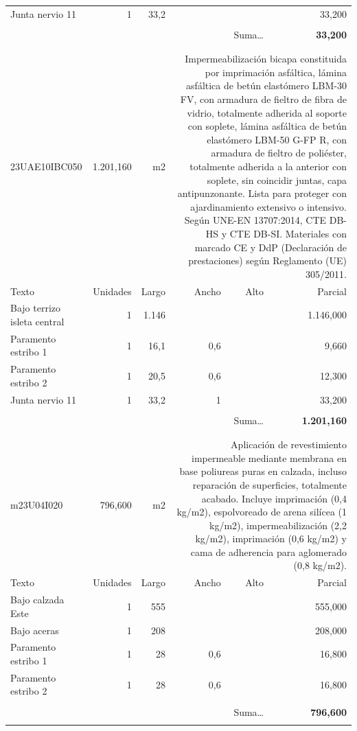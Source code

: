 \documentclass{book}%
\begin{document}
\begin{longtable}{lrrrrr}
\hline%
\multicolumn{1}{p{3.5cm}}{Junta nervio 11}&1&33,2&&&    33,200\\%
&&&&&\\%
\multicolumn{5}{r}{Suma\ldots}&\textbf{    33,200}\\%
\hline%
&&&&&\\%
&&&&&\\%
23UAE10IBC050& 1.201,160& m2&\multicolumn{3}{p{6cm}}{\scriptsize Impermeabilización bicapa constituida por imprimación asfáltica, lámina asfáltica de betún elastómero LBM-30 FV, con armadura de fieltro de fibra de vidrio, totalmente adherida al soporte con soplete, lámina asfáltica de betún elastómero LBM-50 G-FP R, con armadura de fieltro de poliéster, totalmente adherida a la anterior con soplete, sin coincidir juntas, capa antipunzonante. Lista para proteger con ajardinamiento extensivo o intensivo. Según UNE-EN 13707:2014, CTE DB-HS y CTE DB-SI. Materiales con marcado CE y DdP (Declaración de prestaciones) según Reglamento (UE) 305/2011.\normalsize}\\%
Texto&Unidades&Largo&Ancho&Alto&Parcial\\%
\hline%
\multicolumn{1}{p{3.5cm}}{Bajo terrizo isleta central }&1&1.146&&& 1.146,000\\%
\multicolumn{1}{p{3.5cm}}{Paramento estribo 1}&1&16,1&0,6&&     9,660\\%
\multicolumn{1}{p{3.5cm}}{Paramento estribo 2}&1&20,5&0,6&&    12,300\\%
\multicolumn{1}{p{3.5cm}}{Junta nervio 11}&1&33,2&1&&    33,200\\%
&&&&&\\%
\multicolumn{5}{r}{Suma\ldots}&\textbf{ 1.201,160}\\%
\hline%
&&&&&\\%
&&&&&\\%
m23U04I020&   796,600& m2&\multicolumn{3}{p{6cm}}{\scriptsize Aplicación de revestimiento impermeable mediante membrana en base poliureas puras en calzada, incluso reparación de superficies, totalmente acabado. Incluye imprimación (0,4 kg/m2), espolvoreado de arena silícea (1 kg/m2), impermeabilización (2,2 kg/m2), imprimación (0,6 kg/m2) y cama de adherencia para aglomerado (0,8 kg/m2).\normalsize}\\%
Texto&Unidades&Largo&Ancho&Alto&Parcial\\%
\hline%
\multicolumn{1}{p{3.5cm}}{Bajo calzada Este }&1&555&&&   555,000\\%
\multicolumn{1}{p{3.5cm}}{Bajo aceras }&1&208&&&   208,000\\%
\multicolumn{1}{p{3.5cm}}{Paramento estribo 1}&1&28&0,6&&    16,800\\%
\multicolumn{1}{p{3.5cm}}{Paramento estribo 2}&1&28&0,6&&    16,800\\%
&&&&&\\%
\multicolumn{5}{r}{Suma\ldots}&\textbf{   796,600}\\%
\hline%
&&&&&\\%
\end{longtable}%
\newpage
\end{document}
